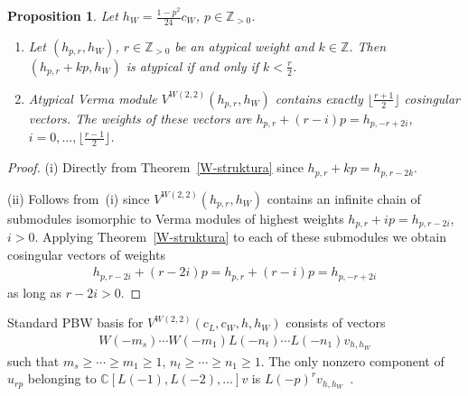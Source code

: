 \documentclass[11pt]{article}
\numberwithin{equation}{section}
\newtheorem{Proposition}[Theorem]{Proposition}
 { \theoremstyle{definition}
\newtheorem{Example}[Theorem]{Example}
\newtheorem{Remark}[Theorem]{Remark} }
\newcommand{\N}{{\mathbb Z}_{> 0} }
\newcommand{\Z}{\mathbb Z}
\newcommand{\C}{\mathbb C}
\begin{document}
\begin{Proposition} \label{svi cosing}
Let $h_W=\frac{1-p^2}{24}c_W$, $p\in\N$.
\begin{enumerate}\itemsep=0pt
\item[$(i)$]Let $(h_{p,r},h_W)$, $r\in\N$ be an atypical weight and $k\in\Z$. Then $(h_{p,r}+kp,h_W)$ is atypical if and only if $k<\frac{r}{2}$.
\item[$(ii)$]Atypical Verma module $V^{W(2,2)}(h_{p,r},h_W)$ contains exactly $\lfloor \frac{r+1}{2} \rfloor$ cosingular vectors. The weights of these vectors are $h_{p,r}+(r-i)p = h_{p,-r+2i}$, $i=0,\ldots,\lfloor \frac{r-1}{2} \rfloor$.
\end{enumerate}
\end{Proposition}

\begin{proof}
(i) Directly from Theorem~\ref{W-struktura} since $h_{p,r}+kp = h_{p,r-2k}$.

(ii) Follows from~(i) since $V^{W(2,2)}(h_{p,r},h_W)$ contains an inf\/inite chain of submodules isomorphic to Verma modules of highest weights $h_{p,r}+ip = h_{p,r-2i}$, $i>0$. Applying Theorem~\ref{W-struktura} to each of these submodules we obtain cosingular vectors of weights
\begin{gather*}
h_{p,r-2i}+(r-2i)p = h_{p,r}+(r-i)p = h_{p,-r+2i}
\end{gather*}
as long as $r-2i>0$.
\end{proof}

\begin{Remark}\label{pbw}
Standard PBW basis for $V^{W(2,2)}(c_{L},c_{W},h,h_{W}) $ consists of vectors
\begin{gather*}
W(-m_{s}) \cdots W(-m_{1}) L(-n_{t}) \cdots L ( -n_{1} ) v_{h,h_W}
\end{gather*}
such that $ m_{s}\geq\cdots\geq m_{1}\geq1$, $n_{t}\geq\cdots\geq n_{1}\geq1 $. The only nonzero component of $u_{rp}$ belonging to $\C [ L(-1) ,L ( -2), \ldots ] v$ is $L(-p)^{r}v_{h,h_W}$~\cite{R-JMP}.
\end{Remark}
\end{document}
